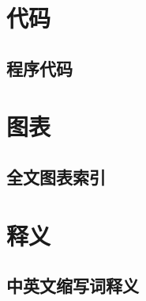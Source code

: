 \appendix
\song {}
\chapter{代码}
	\section{程序代码}
\chapter{图表}
	\section{全文图表索引}
\chapter{释义}
	\section{中英文缩写词释义}
